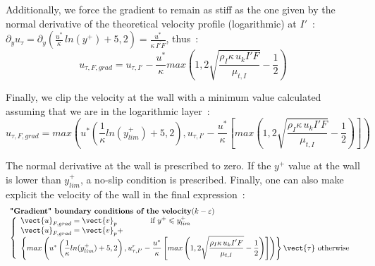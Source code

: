 Additionally, we force the gradient to remain as stiff as the one
given by the normal derivative of the theoretical velocity profile
(logarithmic) at $I'$~:\\
$\partial_y u_{\tau} = \partial_y (\displaystyle
\frac{u^*}{\kappa}\,ln{ (y^+)} + 5,2 ) =\displaystyle\frac{u^*}{\kappa\, \overline{I'F}}$, thus~:
\begin{equation}
u_{\tau,F,grad} =u_{\tau,I'}-\displaystyle\frac{u^*}{\kappa}max\left(1,
2\sqrt{\displaystyle\frac{\rho_I\kappa\, u_k I'F}{\mu_{t,I}} }-\displaystyle\frac{1}{2}\right)
\end{equation}

Finally, we clip the velocity at the wall with a minimum value calculated
assuming that we are in the logarithmic layer~:
\begin{equation}\label{Base_Clptur_eq_ugrad_clptur}
u_{\tau,F,grad} =
max\left(u^*\left(\displaystyle\frac{1}{\kappa}ln(y^+_{lim})+5,2\right),
u_{\tau,I'}-\displaystyle\frac{u^*}{\kappa}\left[max\left(1,
2\sqrt{\displaystyle\frac{\rho_I\kappa\, u_k I'F}{\mu_{t,I}}
}-\displaystyle\frac{1}{2}\right)\right]\right)
\end{equation}


The normal derivative at the wall is prescribed to zero.
If the $y^+$ value at the wall is lower than  $y^+_{lim}$,
a no-slip condition is prescribed. Finally, one can also
make explicit the velocity of the wall in the final expression~:
\begin{equation}
\begin{array}{l}
\text{\bf "Gradient" boundary conditions of the velocity} (k-\varepsilon)\\
\left\{\begin{array}{l}
\vect{u}_{F,grad}=\vect{v}_p
          \qquad\qquad\text{ if }  y^+\leqslant y^+_{lim} \\
\vect{u}_{F,grad}=\vect{v}_p+\\
          \left\{
max\left(u^*\left(\displaystyle\frac{1}{\kappa}ln(y^+_{lim})+5,2\right),
u^r_{\tau,I'}-\displaystyle\frac{u^*}{\kappa}\left[max\left(1,
2\sqrt{\displaystyle\frac{\rho_I\kappa\, u_k I'F}{\mu_{t,I}}
}-\displaystyle\frac{1}{2}\right)\right]\right)
\right\}\vect{\tau}
          \text{ otherwise }
\end{array}\right.
\end{array}
\end{equation}

